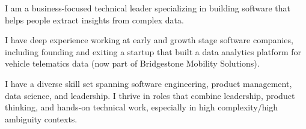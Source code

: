 

\begin{cvparagraph}

I am a business-focused technical leader specializing in building software that helps people extract insights from complex data.

I have deep experience working at early and growth stage software companies, including founding and exiting a startup that built a data analytics platform for vehicle telematics data (now part of Bridgestone Mobility Solutions).

I have a diverse skill set spanning software engineering, product management, data science, and leadership. I thrive in roles that combine leadership, product thinking, and hands-on technical work, especially in high complexity/high ambiguity contexts.

\end{cvparagraph}
